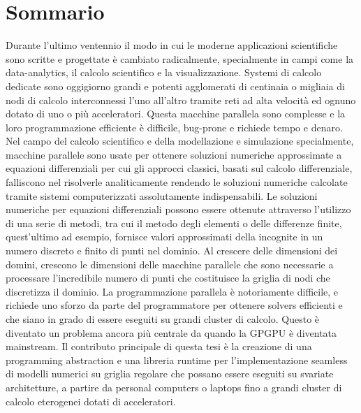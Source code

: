 \endgroup

\cleardoublepage%

\begingroup
\let\clearpage\relax
\let\cleardoublepage\relax
\let\cleardoublepage\relax

\begin{otherlanguage}{nitalian}
\chapter*{Sommario}

Durante l'ultimo ventennio il modo in cui le moderne applicazioni scientifiche sono scritte e progettate è cambiato radicalmente, specialmente in campi come la data-analytics, il calcolo scientifico e la visualizzazione. Systemi di calcolo dedicate sono oggigiorno grandi e potenti agglomerati di centinaia o migliaia di nodi di calcolo interconnessi l'uno all'altro tramite reti ad alta velocità ed ognuno dotato di uno o più acceleratori.
Questa macchine parallela sono complesse e la loro programmazione efficiente è difficile, bug-prone e richiede tempo e denaro.
Nel campo del calcolo scientifico e della modellazione e simulazione specialmente, macchine parallele sono usate per ottenere soluzioni numeriche approssimate a equazioni differenziali per cui gli approcci classici, basati sul calcolo differenziale, falliscono nel risolverle analiticamente rendendo le soluzioni numeriche calcolate tramite sistemi computerizzati assolutamente indispensabili.
Le soluzioni numeriche per equazioni differenziali possono essere ottenute attraverso l'utilizzo di una serie di metodi, tra cui il metodo degli elementi o delle differenze finite, quest'ultimo ad esempio, fornisce valori approssimati della incognite in un numero discreto e finito di punti nel dominio.
Al crescere delle dimensioni dei domini, crescono le dimensioni delle macchine parallele che sono necessarie a processare l'incredibile numero di punti che costituisce la griglia di nodi che discretizza il dominio.
La programmazione parallela è notoriamente difficile, e richiede uno sforzo da parte del programmatore per ottenere solvers efficienti e che siano in grado di essere eseguiti su grandi cluster di calcolo. Questo è diventato un problema ancora più centrale da quando la GPGPU è diventata mainstream.
Il contributo principale di questa tesi è la creazione di una programming abstraction e una libreria runtime per l'implementazione seamless di modelli numerici su griglia regolare che possano essere eseguiti su svariate architetture, a partire da personal computers o laptops fino a grandi cluster di calcolo eterogenei dotati di acceleratori.

\end{otherlanguage}
